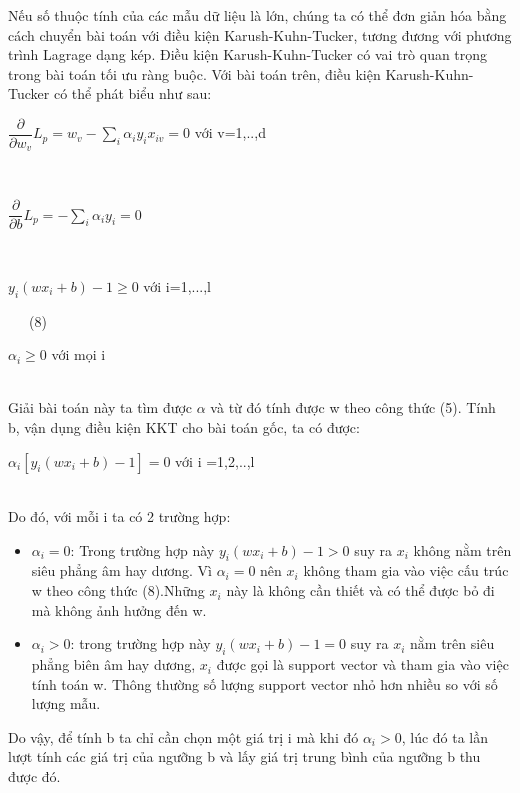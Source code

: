 \documentclass[12pt,a4paper]{article}
\begin{document}
\indent Nếu số thuộc tính của các mẫu dữ liệu là lớn, chúng ta có thể đơn giản hóa bằng cách chuyển bài toán với điều kiện Karush-Kuhn-Tucker, tương đương với phương trình Lagrage dạng kép. Điều kiện Karush-Kuhn-Tucker có vai trò quan trọng trong bài toán tối ưu ràng buộc. Với bài toán trên, điều kiện Karush-Kuhn-Tucker có thể phát biểu như sau: \\
\centerline{$\dfrac{\partial}{\partial w_v}L_p = w_v - \sum_i \alpha_iy_ix_{iv} = 0$ với v=1,..,d}\\
\centerline{$\dfrac{\partial}{\partial b}L_p = -\sum_i\alpha_iy_i=0$}\\
\centerline{$y_i(wx_i+b)-1 \geq 0$ với i=1,...,l}\ \ \ (8)\\
\centerline{$\alpha_i \geq 0$ với mọi i}\\
\indent Giải bài toán này ta tìm được $\alpha$ và từ đó tính được w theo công thức (5). Tính b, vận dụng điều kiện KKT cho bài toán gốc, ta có được:\\
\centerline{$\alpha_i[y_i(wx_i+b)-1]=0$ với i =1,2,..,l}\\
Do đó, với mỗi i ta có 2 trường hợp:\\
\begin{itemize}
    \item $\alpha_i = 0$: Trong trường hợp này $y_i(wx_i+b)-1>0$ suy ra $x_i$ không nằm trên siêu phẳng âm hay dương. Vì $\alpha_i=0$ nên $x_i$ không tham gia vào việc cấu trúc w theo công thức (8).Những $x_i$ này là không cần thiết và có thể được bỏ đi mà không ảnh hưởng đến w.
    \item $\alpha_i>0$: trong trường hợp này $y_i(wx_i+b)-1=0$ suy ra $x_i$ nằm trên siêu phẳng biên âm hay dương, $x_i$ được gọi là support vector và tham gia vào việc tính toán w. Thông thường số lượng support vector nhỏ hơn nhiều so với số lượng mẫu.
\end{itemize}
Do vậy, để tính b ta chỉ cần chọn một giá trị i mà khi đó $\alpha_i>0$, lúc đó ta lần lượt tính các giá trị của ngưỡng b và lấy giá trị trung bình của ngưỡng b thu được đó.
\end{document}
